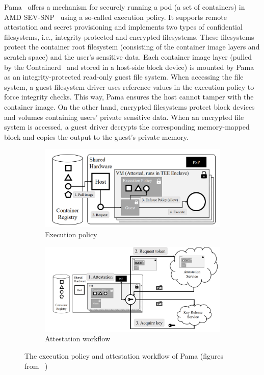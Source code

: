 Pama~\cite*{Johnson2023ParmaCC} offers a mechanism for securely running a pod (a set of containers) in AMD SEV-SNP~\cite*{SEV_SNP_white_book} using a so-called execution policy. It supports remote attestation and secret provisioning and implements two types of confidential filesystems, i.e., integrity-protected and encrypted filesystems. These filesystems protect the container root filesystem 
(consisting of the container image layers and scratch space) and the user's sensitive data. Each container image layer (pulled by the Containerd~\cite*{containerd} and stored in a host-side block device) is mounted by Pama as an 
integrity-protected read-only guest file system. When accessing the file system, a guest filesystem driver uses reference values in the execution policy to force integrity checks. This way, Pama ensures the host cannot tamper with the container image.
On the other hand, encrypted filesystems protect block devices and volumes containing users' private sensitive data. When an encrypted file system is accessed, a guest driver decrypts the corresponding memory-mapped block and copies the output to the guest's private memory. 
\begin{figure}[htp]
    \centering
    \begin{subfigure}[b]{0.45\textwidth}
        \centering
        \includegraphics[width=\textwidth]{images/pama_policy.png}
        \caption{Execution policy}
        \label{fig:pama_policy}
    \end{subfigure}
    \hfill
    \begin{subfigure}[b]{0.45\textwidth}
        \centering
        \includegraphics[width=\textwidth]{images/pama_atte.png}
        \caption{Attestation workflow}
        \label{fig:pama_atte}
    \end{subfigure}
    \hfill
       \caption[The execution policy and attestation workflow of Pama]{The execution policy and attestation workflow of Pama (figures from~\cite*{Johnson2023ParmaCC} )}
       \label{fig:pama}
\end{figure}

